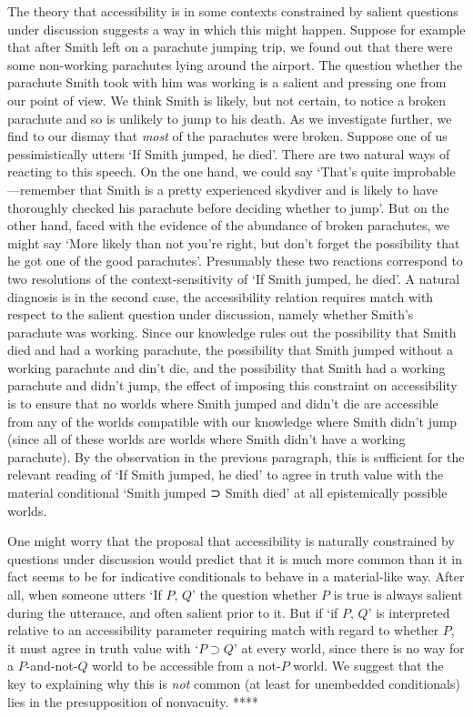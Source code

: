 \documentclass[If.tex]{subfiles}
\begin{document}
The theory that accessibility is in some contexts constrained by salient questions under discussion suggests a way in which this might happen.  Suppose for example that after Smith left on a parachute jumping trip, we found out that there were some non-working parachutes lying around the airport.  The question whether the parachute Smith took with him was working is a salient and pressing one from our point of view.  We think Smith is likely, but not certain, to notice a broken parachute and so is unlikely to jump to his death.  As we investigate further, we find to our dismay that \emph{most} of the parachutes were broken.  Suppose one of us pessimistically utters ‘If Smith jumped, he died’.  There are two natural ways of reacting to this speech.  On the one hand, we could say ‘That's quite improbable---remember that Smith is a pretty experienced skydiver and is likely to have thoroughly checked his parachute before deciding whether to jump’.  But on the other hand, faced with the evidence of the abundance of broken parachutes, we might say ‘More likely than not you're right, but don't forget the possibility that he got one of the good parachutes’.  Presumably these two reactions correspond to two resolutions of the context-sensitivity of ‘If Smith jumped, he died’.  A natural diagnosis is in the second case, the accessibility relation requires match with respect to the salient question under discussion, namely whether Smith's parachute was working.  Since our knowledge rules out the possibility that Smith died and had a working parachute, the possibility that Smith jumped without a working parachute and din't die, and the possibility that Smith had a working parachute and didn't jump, the effect of imposing this constraint on accessibility is to ensure that no worlds where Smith jumped and didn't die are accessible from any of the worlds compatible with our knowledge where Smith didn't jump (since all of these worlds are worlds where Smith didn't have a working parachute).  By the observation in the previous paragraph, this is sufficient for the relevant reading of ‘If Smith jumped, he died’ to agree in truth value with the material conditional ‘Smith jumped ⊃ Smith died’ at all epistemically possible worlds.  

One might worry that the proposal that accessibility is naturally constrained by questions under discussion would predict that it is much more common than it in fact seems to be for indicative conditionals to behave in a material-like way.  After all, when someone utters ‘If $P$, $Q$’ the question whether $P$ is true is always salient during the utterance, and often salient prior to it.  But if ‘if $P$, $Q$’ is interpreted relative to an accessibility parameter requiring match with regard to whether $P$, it must agree in truth value with ‘$P⊃Q$’ at every world, since there is no way for a $P$-and-not-$Q$ world to be accessible from a not-$P$ world.  We suggest that the key to explaining why this is \emph{not} common (at least for unembedded conditionals) lies in the presupposition of nonvacuity.  ****
\end{document}
